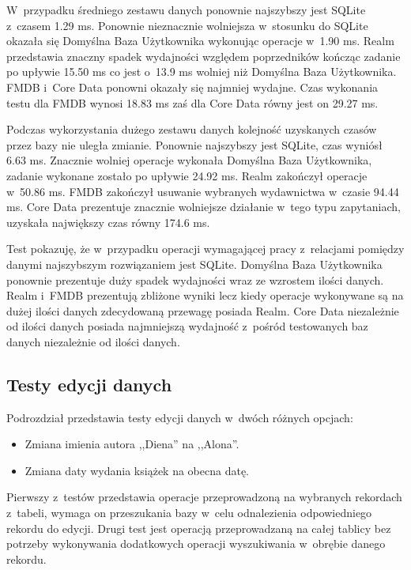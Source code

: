  W~przypadku średniego zestawu danych ponownie najszybszy jest SQLite z~czasem 1.29 ms. Ponownie nieznacznie wolniejsza w~stosunku do SQLite okazała się Domyślna Baza Użytkownika wykonując operacje w~1.90 ms. Realm przedstawia znaczny spadek wydajności względem poprzedników kończąc zadanie po upływie 15.50 ms co jest o~13.9 ms wolniej niż Domyślna Baza Użytkownika. FMDB i~Core Data ponowni okazały się najmniej wydajne. Czas wykonania testu dla FMDB wynosi 18.83 ms zaś dla Core Data równy jest on 29.27 ms.

Podczas wykorzystania dużego zestawu danych kolejność uzyskanych czasów przez bazy nie uległa zmianie. Ponownie najszybszy jest SQLite, czas wyniósł 6.63 ms. Znacznie wolniej operacje wykonała Domyślna Baza Użytkownika, zadanie wykonane zostało po upływie 24.92 ms. Realm zakończył operacje w~50.86 ms. FMDB zakończył usuwanie wybranych wydawnictwa w~czasie 94.44 ms. Core Data prezentuje znacznie wolniejsze działanie w~tego typu zapytaniach, uzyskała największy czas równy 174.6 ms. 

Test pokazuję, że w~przypadku operacji wymagającej pracy z~relacjami pomiędzy danymi najszybszym rozwiązaniem jest SQLite. Domyślna Baza Użytkownika ponownie prezentuje duży spadek wydajności wraz ze wzrostem ilości danych. Realm i~FMDB prezentują zbliżone wyniki lecz kiedy operacje wykonywane są na dużej ilości danych zdecydowaną przewagę posiada Realm. Core Data niezależnie od ilości danych posiada najmniejszą wydajność z~pośród testowanych baz danych niezależnie od ilości danych.

\subsection{Testy edycji danych}

Podrozdział przedstawia testy edycji danych w~dwóch różnych opcjach: 

\begin{itemize}
\item Zmiana imienia autora ,,Diena'' na ,,Alona''.
\item Zmiana daty wydania książek na obecna datę.
\end{itemize}

Pierwszy z~testów przedstawia operacje przeprowadzoną na wybranych rekordach z~tabeli, wymaga on przeszukania bazy w~celu odnalezienia odpowiedniego rekordu do edycji. Drugi test jest operacją przeprowadzaną na całej tablicy bez potrzeby wykonywania dodatkowych operacji wyszukiwania w~obrębie danego rekordu.

